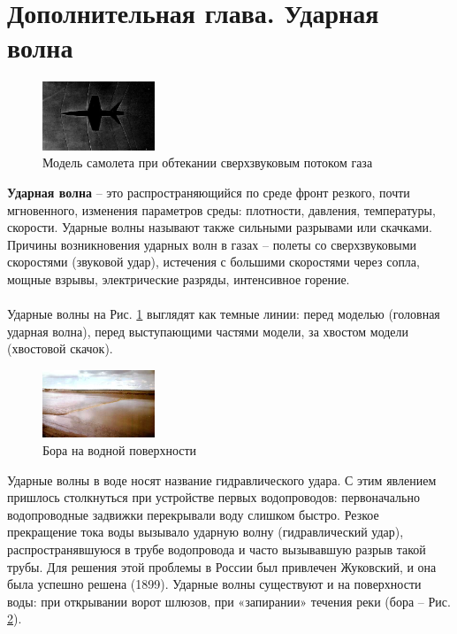 \documentclass[14pt]{article}
\begin{document}
\section{Дополнительная глава. Ударная волна}
\begin{figure} %
    \centering
    \includegraphics[width=0.3\textwidth]{img/ud-voln1.jpg}
    \caption{Модель самолета при обтекании сверхзвуковым потоком газа}
    \label{fig:plane}
\end{figure}
\textbf{Ударная волна} -- это распространяющийся по среде фронт резкого, почти мгновенного, изменения параметров среды: плотности, давления, температуры, скорости. Ударные волны называют также сильными разрывами или скачками. Причины возникновения ударных волн в газах – полеты со сверхзвуковыми скоростями (звуковой удар), истечения с большими скоростями через сопла, мощные взрывы, электрические разряды, интенсивное горение.
\\ \\Ударные волны на Рис. \ref{fig:plane} выглядят как темные линии: перед моделью (головная ударная волна), перед выступающими частями модели, за хвостом модели (хвостовой скачок).

\begin{figure} %
    \centering
    \includegraphics[width=0.3\textwidth]{img/bora.jpg}
    \caption{Бора на водной поверхности}
    \label{fig:bora}
\end{figure}
Ударные волны в воде носят название гидравлического удара. С этим явлением пришлось столкнуться при устройстве первых водопроводов: первоначально водопроводные задвижки перекрывали воду слишком быстро. Резкое прекращение тока воды вызывало ударную волну (гидравлический удар), распространявшуюся в трубе водопровода и часто вызывавшую разрыв такой трубы. Для решения этой проблемы в России был привлечен Жуковский, и она была успешно решена (1899). Ударные волны существуют и на поверхности воды: при открывании ворот шлюзов, при «запирании» течения реки (бора -- Рис. \ref{fig:bora}).
\end{document}
